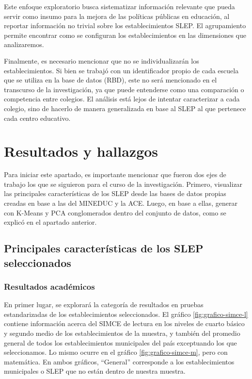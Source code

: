 \documentclass[
  12pt,
  letterpaper,
]{article}
\begin{document}
Este enfoque exploratorio busca sistematizar información relevante que pueda servir como insumo para la mejora de las políticas públicas en educación, al reportar información no trivial sobre los establecimientos SLEP.
El agrupamiento permite encontrar como se configuran los establecimientos en las dimensiones que analizaremos.

Finalmente, es necesario mencionar que no se individualizarán los establecimientos.
Si bien se trabajó con un identificador propio de cada escuela que se utiliza en la base de datos (RBD), este no será mencionado en el transcurso de la investigación, ya que puede entenderse como una comparación o competencia entre colegios.
El análisis está lejos de intentar caracterizar a cada colegio, sino de hacerlo de manera generalizada en base al SLEP al que pertenece cada centro educativo.

\newpage

\section{Resultados y hallazgos}\label{resultados-y-hallazgos}

Para iniciar este apartado, es importante mencionar que fueron dos ejes de trabajo los que se siguieron para el curso de la investigación.
Primero, visualizar las principales características de los SLEP desde las bases de datos propias creadas en base a las del MINEDUC y la ACE.
Luego, en base a ellas, generar con K-Means y PCA conglomerados dentro del conjunto de datos, como se explicó en el apartado anterior.

\subsection{Principales características de los SLEP seleccionados}\label{principales-caracteruxedsticas-de-los-slep-seleccionados}

\subsubsection{Resultados académicos}\label{resultados-acaduxe9micos}

En primer lugar, se explorará la categoría de resultados en pruebas estandarizadas de los establecimientos seleccionados.
El gráfico \ref{fig:grafico-simce-l} contiene información acerca del SIMCE de lectura en los niveles de cuarto básico y segundo medio de los establecimientos de la muestra, y también del promedio general de todos los establecimientos municipales del país exceptuando los que seleccionamos.
Lo mismo ocurre en el gráfico \ref{fig:grafico-simce-m}, pero con matemática.
En ambos gráficos, ``General'' corresponde a los establecimientos municipales o SLEP que no están dentro de nuestra muestra.
\end{document}
